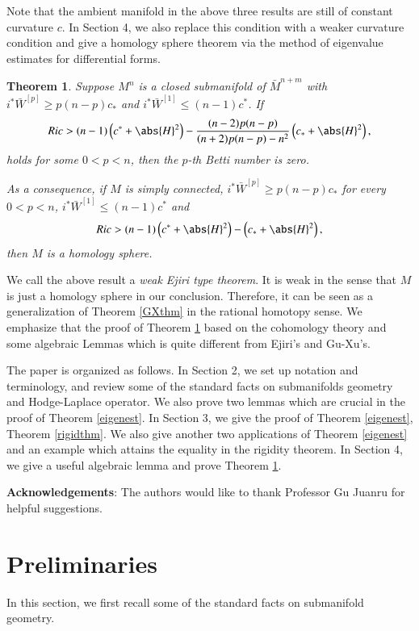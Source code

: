 \documentclass[12pt]{amsart}
\theoremstyle{plain}
\newtheorem{theorem}{Theorem}[section]
\theoremstyle{remark}
\theoremstyle{definition}
\numberwithin{equation}{section}
\begin{document}
Note that the ambient manifold in the above three results are still of constant curvature $c$.
In Section 4, we also replace this condition with a weaker curvature condition and give a homology sphere theorem via the method of eigenvalue estimates for differential forms.
\begin{theorem}\label{thm:eriji}Suppose $M^n$ is a closed submanifold of $\bar{M}^{n+m}$ with $i^*\bar{W}^{[p]}\geq p(n-p)c_*$ and $i^*\bar{W}^{[1]}\leq (n-1)c^*$. If
\begin{align*}
Ric>(n-1)\left(c^*+\abs{H}^2\right)-\dfrac{(n-2)p(n-p)}{(n+2)p(n-p)-n^2}\left(c_*+\abs{H}^2\right),
\end{align*}
holds for some $0<p<n$, then the $p$-th Betti number is zero.

As a consequence, if $M$ is simply connected, $i^*\bar{W}^{[p]}\geq p(n-p)c_*$  for every $0<p<n$, $i^*\bar W^{[1]}\leq (n-1)c^*$ and
\begin{align*}
Ric>(n-1)\left(c^*+\abs{H}^2\right)-\left(c_*+\abs{H}^2\right),
\end{align*}
then $M$ is a homology sphere.
\end{theorem}
We call the above result a {\it weak Ejiri type theorem}. It is weak in the sense that
$M$ is just a homology sphere in our conclusion.
Therefore, it can be seen as a generalization
of Theorem \ref{GXthm} in the rational homotopy sense.
We emphasize that the proof of Theorem \ref{thm:eriji}
based on the cohomology theory and some algebraic Lemmas
 which is quite
different from Ejiri's and Gu-Xu's.

The paper is organized as follows. In Section 2, we set up notation and terminology, and review some
of the standard facts on submanifolds geometry and  Hodge-Laplace operator. We also prove two lemmas
which are crucial in the proof of Theorem \ref{eigenest}.
In Section 3, we give the proof of Theorem \ref{eigenest}, Theorem \ref{rigidthm}. We also give
another two applications of Theorem \ref{eigenest} and an example which attains the equality in the
rigidity theorem. In Section 4, we give a useful algebraic lemma and  prove  Theorem \ref{thm:eriji}.

{\bf Acknowledgements}: The authors would like to thank Professor Gu Juanru for helpful suggestions.

\section{Preliminaries}
In this section, we first recall some of the standard facts on submanifold geometry.
\end{document}
